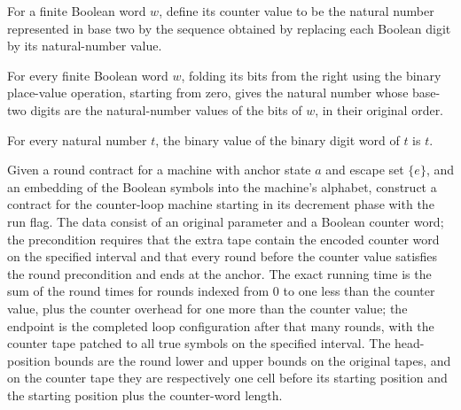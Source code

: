 \begin{definition}
\label{Turing.counterValue}
\leanok
For a finite Boolean word $w$, define its counter value to be the natural number
represented in base two by the sequence obtained by replacing each Boolean digit by its
natural-number value.
\end{definition}

\begin{theorem}
\label{Turing.foldr_bit_eq_ofDigits}
\leanok
{}
For every finite Boolean word $w$, folding its bits from the right using the binary
place-value operation, starting from zero, gives the natural number whose base-two
digits are the natural-number values of the bits of $w$, in their original order.
\end{theorem}

\begin{theorem}
\label{Turing.counterValue_bits}
\leanok
{}
For every natural number $t$, the binary value of the binary digit word of $t$ is $t$.
\end{theorem}

\begin{definition}
\label{Turing.RoundContract.counterLoopDone}
\leanok
{}
Given a round contract for a machine with anchor state $a$ and escape set $\{e\}$, and
an embedding of the Boolean symbols into the machine's alphabet, construct a contract
for the counter-loop machine starting in its decrement phase with the run flag. The data
consist of an original parameter and a Boolean counter word; the precondition requires
that the extra tape contain the encoded counter word on the specified interval and that
every round before the counter value satisfies the round precondition and ends at the
anchor. The exact running time is the sum of the round times for rounds indexed from $0$
to one less than the counter value, plus the counter overhead for one more than the
counter value; the endpoint is the completed loop configuration after that many rounds,
with the counter tape patched to all true symbols on the specified interval. The
head-position bounds are the round lower and upper bounds on the original tapes, and on
the counter tape they are respectively one cell before its starting position and the
starting position plus the counter-word length.
\end{definition}

